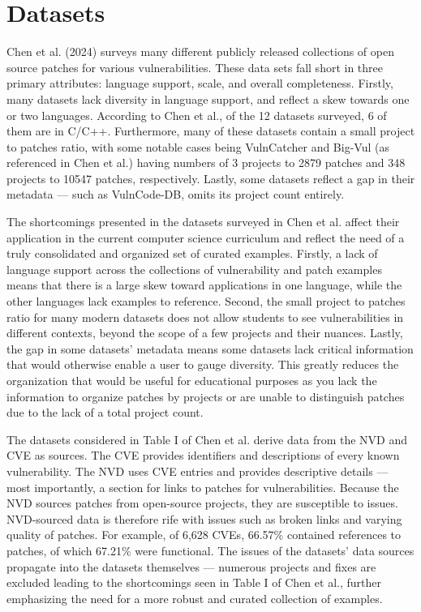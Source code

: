 \section{Datasets}
\done{}

Chen et al. (2024) \cite{chen2024improvingdatacurationsoftware} surveys many different publicly released collections of open source patches for various vulnerabilities. These data sets fall short in three primary attributes: language support, scale, and overall completeness.  Firstly, many datasets lack diversity in language support, and reflect a skew towards one or two languages. According to Chen et al., of the 12 datasets surveyed, 6 of them are in C/C++. Furthermore, many of these datasets contain a small project to patches ratio, with some notable cases being VulnCatcher and Big-Vul (as referenced in Chen et al.) having numbers of 3 projects to 2879 patches and 348 projects to 10547 patches, respectively. Lastly, some datasets reflect a gap in their metadata — such as VulnCode-DB, omits its project count entirely.

The shortcomings presented in the datasets surveyed in Chen et al. affect their application in the current computer science curriculum and reflect the need of a truly consolidated and organized set of curated examples. Firstly, a lack of language support across the collections of vulnerability and patch examples means that there is a large skew toward applications in one language, while the other languages lack examples to reference. Second, the small project to patches ratio for many modern datasets does not allow students to see vulnerabilities in different contexts, beyond the scope of a few projects and their nuances. Lastly, the gap in some datasets' metadata means some datasets lack critical information that would otherwise enable a user to gauge diversity. This greatly reduces the organization that would be useful for educational purposes as you lack the information to organize patches by projects or are unable to distinguish patches due to the lack of a total project count.

The datasets considered in Table I of Chen et al. derive data from the NVD and CVE as sources. The CVE provides identifiers and descriptions of every known vulnerability. The NVD uses CVE entries and provides descriptive details — most importantly, a section for links to patches for vulnerabilities. Because the NVD sources patches from open-source projects, they are susceptible to issues. NVD-sourced data is therefore rife with issues such as broken links and varying quality of patches. For example, of 6,628 CVEs, 66.57\% contained references to patches, of which 67.21\% were functional. The issues of the datasets' data sources propagate into the datasets themselves — numerous projects and fixes are excluded leading to the shortcomings seen in Table I of Chen et al., further emphasizing the need for a more robust and curated collection of examples.